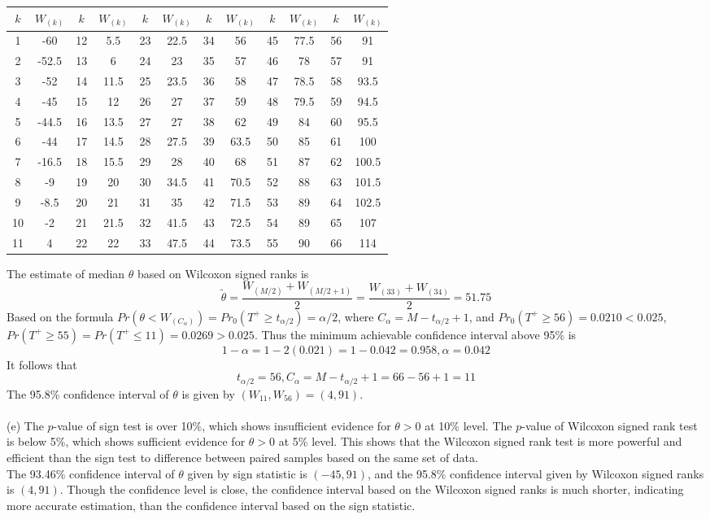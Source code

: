 \documentclass[12pt,a4paper]{article}
\begin{document}
\begin{center}
	\begin{tabular}{ |c c|c c|c c|c c|c c|c c| }
		\hline
		$k$ & $W_{(k)}$ & $k$ & $W_{(k)}$ & $k$ & $W_{(k)}$ & $k$ & $W_{(k)}$ & $k$ & $W_{(k)}$ & $k$ & $W_{(k)}$ \\ 
		\hline
		1 & -60 & 12 & 5.5 & 23 & 22.5& 34 & 56& 45 &77.5 & 56 & 91\\ 
		2 & -52.5 & 13 & 6 & 24 & 23& 35 & 57& 46 & 78& 57 & 91\\ 
		3 & -52 & 14 & 11.5 & 25 & 23.5& 36 & 58& 47 &78.5 & 58 & 93.5\\ 
		4 & -45 & 15 & 12 & 26 & 27& 37 & 59& 48 &79.5 & 59 & 94.5\\
		5 & -44.5 & 16 & 13.5 & 27 & 27& 38 & 62& 49 &84 & 60 & 95.5\\
		6 & -44 & 17 & 14.5 & 28 & 27.5& 39 &63.5 & 50 &85 & 61 & 100\\
		7 & -16.5 & 18 & 15.5 & 29 & 28& 40 & 68& 51 &87 & 62 & 100.5\\
		8 & -9 & 19 & 20 & 30 & 34.5& 41 & 70.5& 52 &88 & 63 & 101.5\\
		9 & -8.5 & 20 & 21 & 31 & 35& 42 & 71.5& 53 & 89& 64 & 102.5\\
		10 & -2 & 21 & 21.5& 32 & 41.5& 43 & 72.5& 54 &89 & 65 & 107\\
		11 & 4 & 22 & 22 & 33 & 47.5& 44 & 73.5& 55 & 90& 66 & 114\\
		\hline
	\end{tabular}
\end{center}
The estimate of median $\theta$ based on Wilcoxon signed ranks is
$$\tilde\theta=\frac{W_{(M/2)}+W_{(M/2+1)}}{2}=\frac{W_{(33)}+W_{(34)}}{2}=51.75$$
Based on the formula $Pr(\theta <W_{(C_{\alpha})})=Pr_{0}(T^{+}\geqslant t_{\alpha/2})=\alpha/2$, where $C_{\alpha}=M-t_{\alpha/2}+1$, and  $Pr_{0}(T^{+}\geqslant 56)=0.0210<0.025$, $Pr(T^{+}\geqslant 55)=Pr(T^{+}\leqslant 11)=0.0269>0.025$. Thus the minimum achievable confidence interval above 95\% is
$$1-\alpha=1-2(0.021)=1-0.042=0.958, \alpha=0.042$$
It follows that
$$t_{\alpha/2}=56,C_{\alpha}=M-t_{\alpha/2}+1=66-56+1=11$$
The 95.8\% confidence interval of $\theta$ is given by $(W_{11},W_{56})=(4,91)$.\\
~\\
(e) The $p$-value of sign test is over 10\%, which shows insufficient evidence for $\theta >0$ at 10\% level. The $p$-value of Wilcoxon signed rank test is below 5\%, which shows sufficient evidence for $\theta >0$ at 5\% level. This shows that the Wilcoxon signed rank test is more powerful and efficient than the sign test to difference between paired samples based on the same set of data.\\
\indent The 93.46\% confidence interval of $\theta$ given by sign statistic is $(-45,91)$, and the 95.8\% confidence interval given by Wilcoxon signed ranks is $(4,91)$. Though the confidence level is close, the confidence interval based on the Wilcoxon signed ranks is much shorter, indicating more accurate estimation, than the confidence interval based on the sign statistic.
\end{document}
